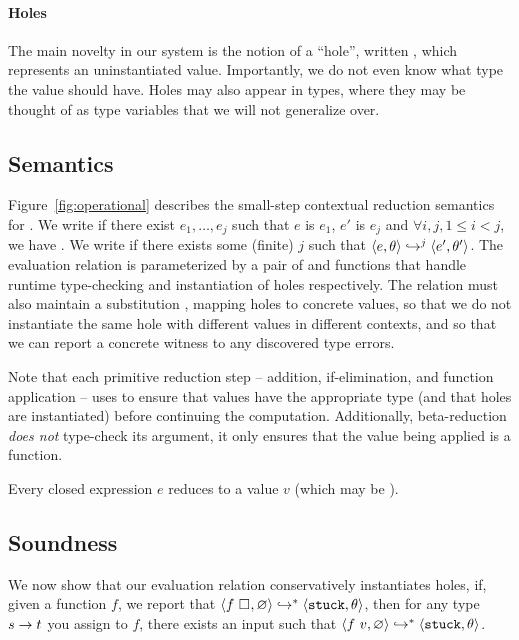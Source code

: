 \paragraph{Holes}
\label{sec:holes}
The main novelty in our system is the notion of a ``hole'', written
\ehole{}, which represents an uninstantiated value.
%
Importantly, we do not even know what type the value should have.
%
Holes may also appear in types, where they may be thought of as type
variables that we will not generalize over.
%
\subsection{Semantics}
\label{sec:semantics}

%
Figure~\ref{fig:operational} describes the small-step contextual
reduction semantics for \lang.
%
We write  if there exist $e_1,\ldots,e_j$ such that
$e$ is $e_1$, $e'$ is $e_j$ and $\forall i,j, 1 \leq i < j$, we have
.
%
We write  if there exists some (finite) $j$ such that
$\stepi{j}{e}{\su}{e'}{\su'}$.
%
The evaluation relation is parameterized by a pair of \forcesym and
\gensym functions that handle runtime type-checking and instantiation of
holes respectively.
%
The relation must also maintain a substitution \su, mapping holes to
concrete values, so that we do not instantiate the same hole with
different values in different contexts, and so that we can report a
concrete witness to any discovered type errors.

Note that each primitive reduction step -- addition, if-elimination, and
function application -- uses \forcesym to ensure that values have the
appropriate type (and that holes are instantiated) before continuing the
computation.
%
Additionally, beta-reduction \emph{does not} type-check its argument, it
only ensures that the value being applied is a function.
%
\begin{thm}
\label{thm:all-reduce}
  Every closed expression $e$ reduces to a value $v$ (which may be \stuck).
\end{thm}
%
\subsection{Soundness}
\label{sec:soundness}
We now show that our evaluation relation conservatively instantiates
holes, \ie if, given a function $f$, we report that
$\steps{\eapp{f}{\ehole{}}}{\emptysu}{\stuck}{\su}$,
then for any type $\tfun{s}{t}$ you assign to $f$, there exists an input  such that
$\steps{\eapp{f}{v}}{\emptysu}{\stuck}{\su}$.

